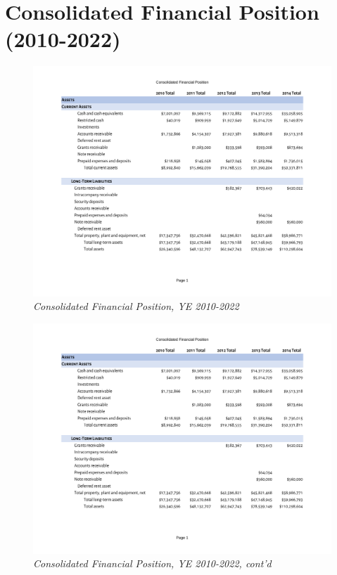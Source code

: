 
\chapter{Consolidated Financial Position (2010-2022)}\label{ch:consolidated_financial_position}

\begin{figure}
  \caption[Consolidated Financial Position, Years Ending 2010–2022]{\textit{Consolidated Financial Position, YE 2010-2022}}
  \label{fig:consolidated_financial_position_2010-2022} %
  \includegraphics[page=1,width=\textheight]{Consolidated_Financial_Position_Years_2010-2022} %
\end{figure}

\begin{figure}
  \caption*{\textit{Consolidated Financial Position, YE 2010-2022, cont'd}}
 \label{fig:consolidated_financial_position_2010-2022} %
 \includegraphics[page=2,width=\textheight]{Consolidated_Financial_Position_Years_2010-2022} %
\end{figure}

